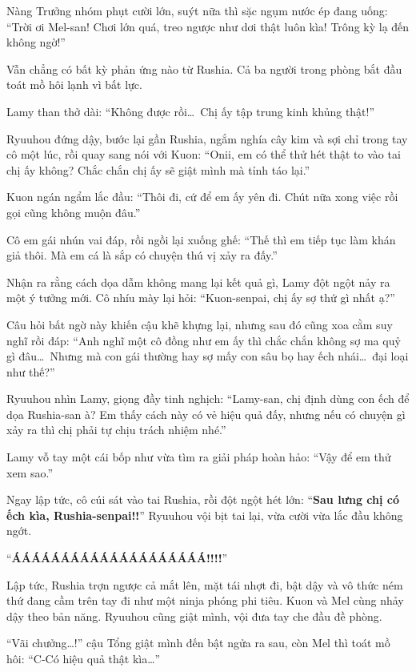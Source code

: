 \documentclass[../main.tex]{subfiles}
\begin{document}

Nàng Trưởng nhóm phụt cười lớn, suýt nữa thì sặc ngụm nước ép đang uống: ``Trời ơi Mel-san! Chơi lớn quá, treo ngược như dơi thật luôn kìa! Trông kỳ lạ đến không ngờ!''

Vẫn chẳng có bất kỳ phản ứng nào từ Rushia. Cả ba người trong phòng bắt đầu toát mồ hôi lạnh vì bất lực.

Lamy than thở dài: ``Không được rồi\dots\ Chị ấy tập trung kinh khủng thật!''

Ryuuhou đứng dậy, bước lại gần Rushia, ngắm nghía cây kim và sợi chỉ trong tay cô một lúc, rồi quay sang nói với Kuon: ``Onii, em có thể thử hét thật to vào tai chị ấy không? Chắc chắn chị ấy sẽ giật mình mà tỉnh táo lại.''

Kuon ngán ngẩm lắc đầu: ``Thôi đi, cứ để em ấy yên đi. Chút nữa xong việc rồi gọi cũng không muộn đâu.''

Cô em gái nhún vai đáp, rồi ngồi lại xuống ghế: ``Thế thì em tiếp tục làm khán giả thôi. Mà em cá là sắp có chuyện thú vị xảy ra đấy.''

Nhận ra rằng cách dọa dẫm không mang lại kết quả gì, Lamy đột ngột nảy ra một ý tưởng mới. Cô nhíu mày lại hỏi: ``Kuon-senpai, chị ấy sợ thứ gì nhất ạ?''

Câu hỏi bất ngờ này khiến cậu khẽ khựng lại, nhưng sau đó cũng xoa cằm suy nghĩ rồi đáp: ``Anh nghĩ một cô đồng như em ấy thì chắc chắn không sợ ma quỷ gì đâu\dots\ Nhưng mà con gái thường hay sợ mấy con sâu bọ hay ếch nhái\dots\ đại loại như thế?''

Ryuuhou nhìn Lamy, giọng đầy tinh nghịch: ``Lamy-san, chị định dùng con ếch để dọa Rushia-san à? Em thấy cách này có vẻ hiệu quả đấy, nhưng nếu có chuyện gì xảy ra thì chị phải tự chịu trách nhiệm nhé.''

Lamy vỗ tay một cái bốp như vừa tìm ra giải pháp hoàn hảo: ``Vậy để em thử xem sao.''

Ngay lập tức, cô cúi sát vào tai Rushia, rồi đột ngột hét lớn: ``\textbf{Sau lưng chị có ếch kìa, Rushia-senpai!!}'' Ryuuhou vội bịt tai lại, vừa cười vừa lắc đầu không ngớt.

``\textbf{ÁÁÁÁÁÁÁÁÁÁÁÁÁÁÁÁÁÁÁÁ!!!!}''

Lập tức, Rushia trợn ngược cả mắt lên, mặt tái nhợt đi, bật dậy và vô thức ném thứ đang cầm trên tay đi như một ninja phóng phi tiêu. Kuon và Mel cùng nhảy dậy theo bản năng. Ryuuhou cũng giật mình, vội đưa tay che đầu đề phòng.

``Vãi chưởng\dots!'' cậu Tổng giật mình đến bật ngửa ra sau, còn Mel thì toát mồ hôi: ``C-Có hiệu quả thật kìa\dots''
\end{document}

